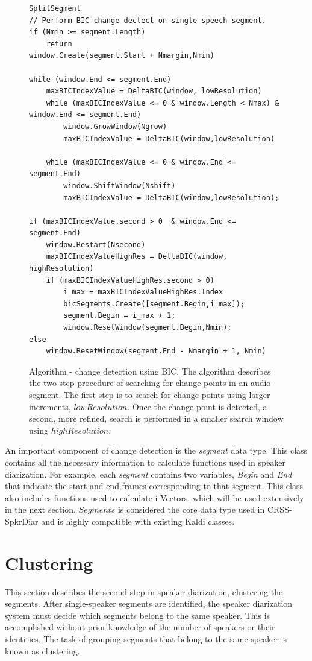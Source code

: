 \begin{figure}
\begin{lstlisting}
SplitSegment
// Perform BIC change dectect on single speech segment.
if (Nmin >= segment.Length) 
	return
window.Create(segment.Start + Nmargin,Nmin)

while (window.End <= segment.End) 
	maxBICIndexValue = DeltaBIC(window, lowResolution)
	while (maxBICIndexValue <= 0 & window.Length < Nmax) & window.End <= segment.End) 
		window.GrowWindow(Ngrow)
		maxBICIndexValue = DeltaBIC(window,lowResolution)
		
	while (maxBICIndexValue <= 0 & window.End <= segment.End) 
		window.ShiftWindow(Nshift)
		maxBICIndexValue = DeltaBIC(window,lowResolution);
	
if (maxBICIndexValue.second > 0  & window.End <= segment.End) 
	window.Restart(Nsecond)
	maxBICIndexValueHighRes = DeltaBIC(window, highResolution)
	if (maxBICIndexValueHighRes.second > 0) 
		i_max = maxBICIndexValueHighRes.Index
		bicSegments.Create([segment.Begin,i_max]);
		segment.Begin = i_max + 1;
		window.ResetWindow(segment.Begin,Nmin);
else 
	window.ResetWindow(segment.End - Nmargin + 1, Nmin)
\end{lstlisting}
\caption{Algorithm - change detection using BIC. The algorithm describes the two-step procedure of searching for change points in an audio segment. The first step is to search for change points using larger increments, $lowResolution$. Once the change point is detected, a second, more refined, search is performed in a smaller search window using $highResolution$.}
\label{alg:changedetection}
\end{figure}

An important component of change detection is the {\it segment} data type. 
This class contains all the necessary information to calculate functions used in speaker diarization. 
For example, each {\it segment} contains two variables, {\it Begin} and {\it End} that indicate the start and end frames corresponding to that segment. 
This class also includes functions used to calculate i-Vectors, which will be used extensively in the next section. 
$Segments$ is considered the core data type used in CRSS-SpkrDiar and is highly compatible with existing Kaldi classes. 


\section{Clustering}
\label{sec:clustering}
This section describes the second step in speaker diarization, clustering the segments. 
After single-speaker segments are identified, the speaker diarization system must decide which segments belong to the same speaker. 
This is accomplished without prior knowledge of the number of speakers or their identities. 
The task of grouping segments that belong to the same speaker is known as clustering. 

